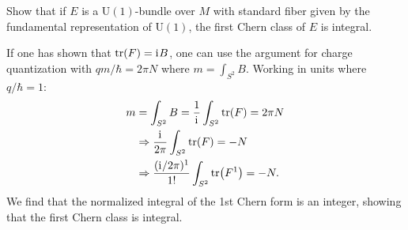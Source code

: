 \documentclass[10pt]{article}
\begin{document}
\begin{example}
	Show that if $E$ is a U$(1)$-bundle over $M$ with standard fiber given by the fundamental representation of U$(1)$, the first Chern class of $E$ is integral.
\end{example}
\sol If one has shown that $\tr(F)=\mathrm{i}\mkern1mu B$, one can use the argument for charge quantization with $qm/\hbar=2\pi N$ where $m=\int_{S^2}B$. Working in units where $q/\hbar=1$:
$$
\begin{aligned}
	m &= \int_{S^2}B=\frac1{\mathrm{i}\mkern1mu}\int_{S^2}\tr(F)=2\pi N\\
	&\Rightarrow \frac{\mathrm{i}\mkern1mu}{2\pi} \int_{S^2}\tr(F)=-N\\
	&\Rightarrow \frac{(\mathrm{i}\mkern1mu/2\pi)^1}{1!} \int_{S^2}\tr(F^1)=-N.
\end{aligned}
$$
We find that the normalized integral of the 1st Chern form is an integer, showing that the first Chern class is integral.
\end{document}
